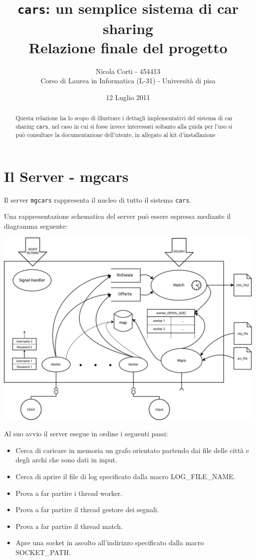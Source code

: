 \documentclass[a4paper,10pt]{article}
\title{\texttt{cars}: un semplice sistema di car sharing \\ Relazione finale del progetto}
\author{Nicola Corti - 454413 \\Corso di Laurea in Informatica (L-31) - Universit\`a di pisa}
\date{12 Luglio 2011}
\begin{document}
\maketitle 
 
\begin{abstract}
Questa relazione ha lo scopo di illustrare i dettagli implementativi del sistema di car sharing \texttt{cars}, nel caso in cui si fosse invece  interessati soltanto alla guida per l'uso si pu\`o consultare la documentazione dell'utente, in allegato al kit d'installazione
\end{abstract}
 
\tableofcontents
 
\section{Il Server - mgcars}

Il server \texttt{mgcars} rappresenta il nucleo di tutto il sistema \texttt{cars}.

Una rappresentazione schematica del server pu\`o essere espressa mediante il diagramma seguente:
\begin{center}
	\includegraphics[scale=0.20]{../doc/tex/img/server.png}
\end{center}
Al suo avvio il server esegue in ordine i seguenti passi:

\begin{itemize}
	\item Cerca di caricare in memoria un grafo orientato partendo dai file 
	delle citt\`a e degli archi che sono dati in input.
	\item Cerca di aprire il file di log specificato dalla macro LOG\_FILE\_NAME.
	\item Prova a far partire i thread worker.	
	\item Prova a far partire il thread gestore dei segnali.
	\item Prova a far partire il thread match.
	\item Apre una socket in ascolto all'indirizzo specificato dalla macro SOCKET\_PATH.	
\end{itemize}
\end{document}

